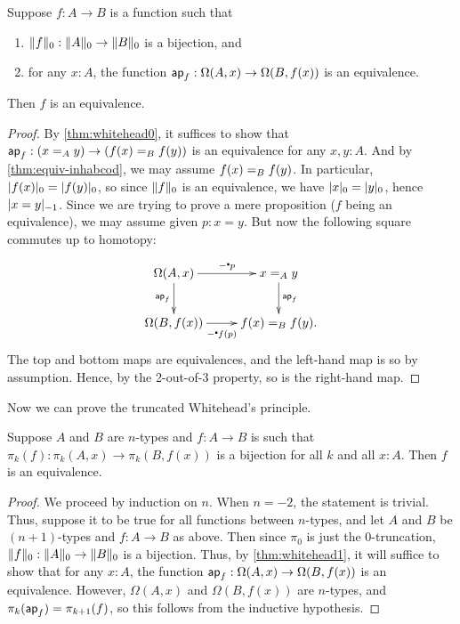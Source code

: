 \begin{cor}\label{thm:whitehead1}
  Suppose $f:A\to B$ is a function such that
  \begin{enumerate}
  \item $\trunc0 f : \trunc0 A \to \trunc0 B$ is a bijection, and
  \item for any $x:A$, the function $\apfunc f : \Omega(A,x) \to \Omega(B,f(x))$ is an equivalence.
  \end{enumerate}
  Then $f$ is an equivalence.
\end{cor}
\begin{proof}
  By \autoref{thm:whitehead0}, it suffices to show that $\apfunc f : (\id[A]xy) \to (\id[B]{f(x)}{f(y)})$ is an equivalence for any $x,y:A$.
  And by \autoref{thm:equiv-inhabcod}, we may assume $\id[B]{f(x)}{f(y)}$.
  In particular, $\tproj0{f(x)} = \tproj0{f(y)}$, so since $\trunc0 f$ is an equivalence, we have $\tproj0 x = \tproj0y$, hence $\tproj{-1}{x=y}$.
  Since we are trying to prove a mere proposition ($f$ being an equivalence), we may assume given $p:x=y$.
  But now the following square commutes up to homotopy:
  \begin{equation*}
  \vcenter{\xymatrix{
      \Omega(A,x)\ar[r]^-{-\ct p}\ar[d]_{\apfunc f} &
      \id[A]xy \ar[d]^{\apfunc f}\\
      \Omega(B,f(x))\ar[r]_-{-\ct f(p)} &
      \id[B]{f(x)}{f(y)}.
      }}
  \end{equation*}
  The top and bottom maps are equivalences, and the left-hand map is so by assumption.
  Hence, by the 2-out-of-3 property, so is the right-hand map.
\end{proof}

Now we can prove the truncated Whitehead's principle.

\begin{thm}\label{thm:whiteheadn}
  Suppose $A$ and $B$ are $n$-types and $f:A\to B$ is such that $\pi_k(f):\pi_k(A,x) \to \pi_k(B,f(x))$ is a bijection for all $k$ and all $x:A$.
  Then $f$ is an equivalence.
\end{thm}
\begin{proof}
  We proceed by induction on $n$.
  When $n=-2$, the statement is trivial.
  Thus, suppose it to be true for all functions between $n$-types, and let $A$ and $B$ be $(n+1)$-types and $f:A\to B$ as above.
  Then since $\pi_0$ is just the 0-truncation, $\trunc0f:\trunc0A \to \trunc0B$ is a bijection.
  Thus, by \autoref{thm:whitehead1}, it will suffice to show that for any $x:A$, the function $\apfunc f: \Omega(A,x) \to \Omega(B,f(x))$ is an equivalence.
  However, $\Omega(A,x)$ and $\Omega(B,f(x))$ are $n$-types, and $\pi_k(\apfunc f) = \pi_{k+1}(f)$, so this follows from the inductive hypothesis.
\end{proof}

